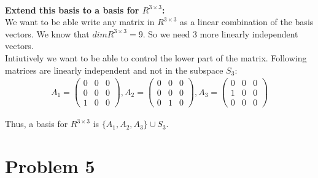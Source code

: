 \documentclass{article}
\begin{document}
\\
\textbf{Extend this basis to a basis for \(R^{3 \times 3}\):} \\
We want to be able write any matrix in \(R^{3 \times 3}\) as a linear combination of the basis vectors. We know that \(dim R^{3 \times 3} = 9\). So we need 3 more linearly independent vectors. \\
Intiutively we want to be able to control the lower part of the matrix. Following matrices are linearly independent and not in the subspace \(S_3\):
\begin{align*}
   A_1 = \begin{pmatrix}
      0 & 0 & 0 \\
      0 & 0 & 0 \\
      1 & 0 & 0
   \end{pmatrix}, A_2 = \begin{pmatrix}
      0 & 0 & 0 \\
      0 & 0 & 0 \\
      0 & 1 & 0
   \end{pmatrix}, A_3 = \begin{pmatrix}
      0 & 0 & 0 \\
      1 & 0 & 0 \\
      0 & 0 & 0
   \end{pmatrix}
\end{align*}

Thus, a basis for \(R^{3 \times 3}\) is \(\{A_1, A_2, A_3\} \cup S_3\).

\section*{Problem 5}
\end{document}
